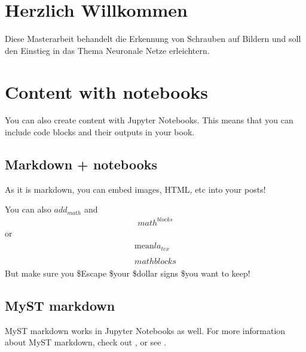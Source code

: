 \documentclass[letterpaper,10pt,english]{jupyterBook}
\begin{document}
\chapter{Herzlich Willkommen}
\label{\detokenize{00_Intro/markdown:herzlich-willkommen}}\label{\detokenize{00_Intro/markdown::doc}}
\sphinxAtStartPar
Diese Masterarbeit behandelt die Erkennung von Schrauben auf Bildern und soll den Einstieg in das Thema Neuronale Netze erleichtern.


\chapter{Content with notebooks}
\label{\detokenize{00_Intro/notebooks:content-with-notebooks}}\label{\detokenize{00_Intro/notebooks::doc}}
\sphinxAtStartPar
You can also create content with Jupyter Notebooks. This means that you can include
code blocks and their outputs in your book.


\section{Markdown + notebooks}
\label{\detokenize{00_Intro/notebooks:markdown-notebooks}}
\sphinxAtStartPar
As it is markdown, you can embed images, HTML, etc into your posts!

\sphinxAtStartPar
{}

\sphinxAtStartPar
You can also \(add_{math}\) and
\begin{equation*}
\begin{split}
math^{blocks}
\end{split}
\end{equation*}
\sphinxAtStartPar
or
\begin{equation*}
\begin{split}
\begin{aligned}
\mbox{mean} la_{tex} \\ \\
math blocks
\end{aligned}
\end{split}
\end{equation*}
\sphinxAtStartPar
But make sure you \$Escape \$your \$dollar signs \$you want to keep!


\section{MyST markdown}
\label{\detokenize{00_Intro/notebooks:myst-markdown}}
\sphinxAtStartPar
MyST markdown works in Jupyter Notebooks as well. For more information about MyST markdown, check
out ,
or see .
\end{document}
